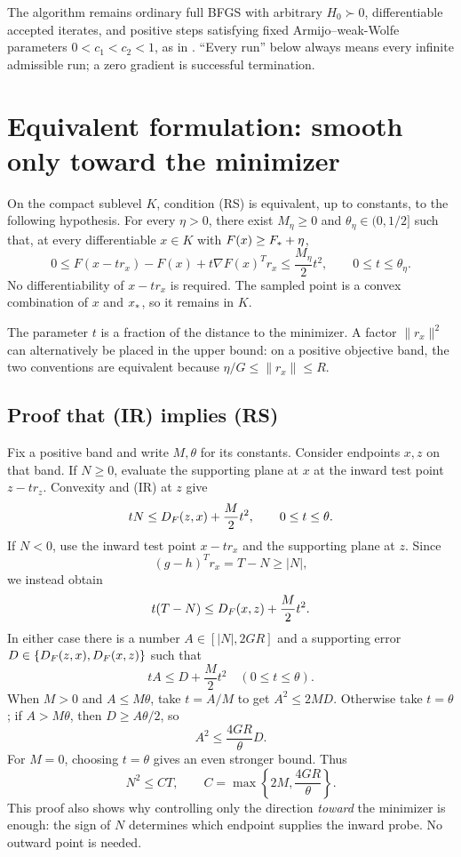 The algorithm remains ordinary full BFGS with arbitrary $H_0\succ0$, differentiable accepted iterates, and positive steps satisfying fixed Armijo--weak-Wolfe parameters $0<c_1<c_2<1$, as in \cite{XW}. ``Every run'' below always means every infinite admissible run; a zero gradient is successful termination.


\setcounter{section}{1}
\setcounter{theorem}{0}
\setcounter{equation}{1}


\section{Equivalent formulation: smooth only toward the minimizer}
\begin{theorem}\label{R:thm:equiv}
On the compact sublevel $K$, condition (RS) is equivalent, up to constants, to the following hypothesis. For every $\eta>0$, there exist $M_\eta\ge0$ and $\theta_\eta\in(0,1/2]$ such that, at every differentiable $x\in K$ with $F(x)\ge F_*+\eta$,
\begin{equation}
 0\le F(x-t r_x)-F(x)+t\nabla F(x)^Tr_x
 \le \frac{M_\eta}{2}t^2,
 \qquad 0\le t\le\theta_\eta.
 \tag{4.IR}\label{R:eq:IR}
\end{equation}
No differentiability of $x-t r_x$ is required. The sampled point is a convex combination of $x$ and $x_*$, so it remains in $K$.
\end{theorem}
The parameter $t$ is a fraction of the distance to the minimizer. A factor $\|r_x\|^2$ can alternatively be placed in the upper bound: on a positive objective band, the two conventions are equivalent because $\eta/G\le\|r_x\|\le R$.



\subsection{Proof that (IR) implies (RS)}
Fix a positive band and write $M,\theta$ for its constants. Consider endpoints $x,z$ on that band. If $N\ge0$, evaluate the supporting plane at $x$ at the inward test point $z-t r_z$. Convexity and (IR) at $z$ give
\[
 tN\le D_F(z,x)+\frac M2t^2,\qquad 0\le t\le\theta.
\]
If $N<0$, use the inward test point $x-t r_x$ and the supporting plane at $z$. Since
\[
 (g-h)^Tr_x=T-N\ge|N|,
\]
we instead obtain
\[
 t(T-N)\le D_F(x,z)+\frac M2t^2.
\]
In either case there is a number $A\in[|N|,2GR]$ and a supporting error $D\in\{D_F(z,x),D_F(x,z)\}$ such that
\[
 tA\le D+\frac M2t^2\quad(0\le t\le\theta).
\]
When $M>0$ and $A\le M\theta$, take $t=A/M$ to get $A^2\le2MD$. Otherwise take $t=\theta$; if $A>M\theta$, then $D\ge A\theta/2$, so
\[
 A^2\le \frac{4GR}{\theta}D.
\]
For $M=0$, choosing $t=\theta$ gives an even stronger bound. Thus
\begin{equation}
 N^2\le C T,\qquad
 C=\max\left\{2M,\frac{4GR}{\theta}\right\}.
 \label{R:eq:IRtoRS}
\end{equation}
This proof also shows why controlling only the direction \emph{toward} the minimizer is enough: the sign of $N$ determines which endpoint supplies the inward probe. No outward point is needed.

